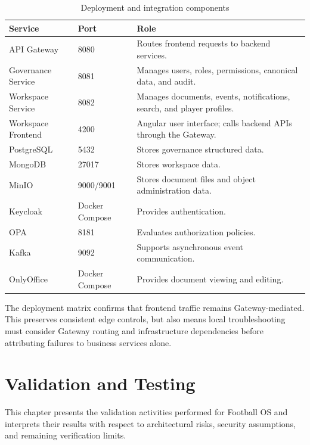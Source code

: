 \begin{table}[ht]
\centering
\caption{Deployment and integration components}
\label{tab:deployment-integration}
\small
\setlength{\tabcolsep}{4pt}
\renewcommand{\arraystretch}{1.10}
\begin{tabularx}{\textwidth}{|L{3.8cm}|C{1.8cm}|Y|}
\hline
\textbf{Service} & \textbf{Port} & \textbf{Role} \\
\hline
API Gateway & 8080 & Routes frontend requests to backend services. \\
\hline
Governance Service & 8081 & Manages users, roles, permissions, canonical data, and audit. \\
\hline
Workspace Service & 8082 & Manages documents, events, notifications, search, and player profiles. \\
\hline
Workspace Frontend & 4200 & Angular user interface; calls backend APIs through the Gateway. \\
\hline
PostgreSQL & 5432 & Stores governance structured data. \\
\hline
MongoDB & 27017 & Stores workspace data. \\
\hline
MinIO & 9000/9001 & Stores document files and object administration data. \\
\hline
Keycloak & Docker Compose & Provides authentication. \\
\hline
OPA & 8181 & Evaluates authorization policies. \\
\hline
Kafka & 9092 & Supports asynchronous event communication. \\
\hline
OnlyOffice & Docker Compose & Provides document viewing and editing. \\
\hline
\end{tabularx}
\normalsize
\end{table}

The deployment matrix confirms that frontend traffic remains Gateway-mediated.
This preserves consistent edge controls, but also means local troubleshooting
must consider Gateway routing and infrastructure dependencies before attributing
failures to business services alone.

\section{Validation and Testing}

This chapter presents the validation activities performed for Football OS and
interprets their results with respect to architectural risks, security
assumptions, and remaining verification limits.

